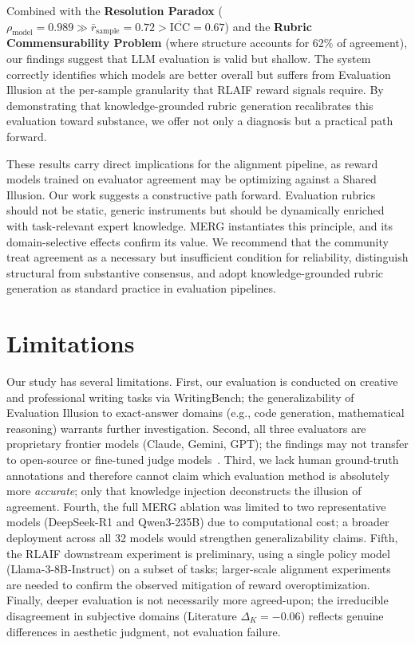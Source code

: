 \documentclass{article}
\begin{document}
Combined with the \textbf{Resolution Paradox} ($\rho_{\text{model}} = 0.989 \gg \bar{r}_{\text{sample}} = 0.72 > \overline{\text{ICC}} = 0.67$) and the \textbf{Rubric Commensurability Problem} (where structure accounts for 62\% of agreement), our findings suggest that LLM evaluation is valid but shallow. The system correctly identifies which models are better overall but suffers from Evaluation Illusion at the per-sample granularity that RLAIF reward signals require. By demonstrating that knowledge-grounded rubric generation recalibrates this evaluation toward substance, we offer not only a diagnosis but a practical path forward.

These results carry direct implications for the alignment pipeline, as reward models trained on evaluator agreement may be optimizing against a Shared Illusion. Our work suggests a constructive path forward. Evaluation rubrics should not be static, generic instruments but should be dynamically enriched with task-relevant expert knowledge. MERG instantiates this principle, and its domain-selective effects confirm its value. We recommend that the community treat agreement as a necessary but insufficient condition for reliability, distinguish structural from substantive consensus, and adopt knowledge-grounded rubric generation as standard practice in evaluation pipelines.


\section*{Limitations}

Our study has several limitations. First, our evaluation is conducted on creative and professional writing tasks via WritingBench; the generalizability of Evaluation Illusion to exact-answer domains (e.g., code generation, mathematical reasoning) warrants further investigation. Second, all three evaluators are proprietary frontier models (Claude, Gemini, GPT); the findings may not transfer to open-source or fine-tuned judge models~\citep{zhu2025judgelm}. Third, we lack human ground-truth annotations and therefore cannot claim which evaluation method is absolutely more \textit{accurate}; only that knowledge injection deconstructs the illusion of agreement. Fourth, the full MERG ablation was limited to two representative models (DeepSeek-R1 and Qwen3-235B) due to computational cost; a broader deployment across all 32 models would strengthen generalizability claims. Fifth, the RLAIF downstream experiment is preliminary, using a single policy model (Llama-3-8B-Instruct) on a subset of tasks; larger-scale alignment experiments are needed to confirm the observed mitigation of reward overoptimization. Finally, deeper evaluation is not necessarily more agreed-upon; the irreducible disagreement in subjective domains (Literature $\Delta_K = -0.06$) reflects genuine differences in aesthetic judgment, not evaluation failure.
\end{document}
